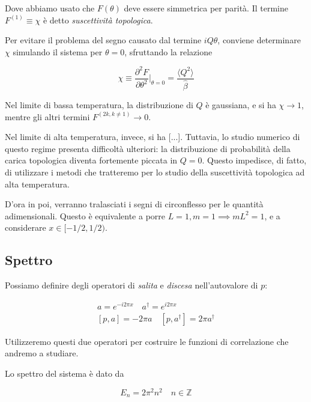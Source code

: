 \documentclass[a4paper,11pt]{article}
\newcommand{\avg}[1]{\langle {#1} \rangle}
\begin{document}
    Dove abbiamo usato che $F(\theta)$ deve essere simmetrica per parità. Il termine $F^{(1)} \equiv \chi$ è detto \emph{suscettività topologica}.
    
    Per evitare il problema del segno causato dal termine $iQ\theta$, conviene determinare $\chi$ simulando il sistema per $\theta = 0$, sfruttando la relazione
    
    \begin{equation}
        \chi \equiv \frac{\partial^2 F}{\partial \theta^2} \bigg\rvert_{\theta = 0} = \frac{\avg{Q^2}}{
        \hat{\beta}}
    \end{equation}
    
    Nel limite di bassa temperatura, la distribuzione di $Q$ è gaussiana, e si ha $\chi \to 1$, mentre gli altri termini $F^{(2k, k \neq 1)} \to 0$.
    
    Nel limite di alta temperatura, invece, si ha [...]. Tuttavia, lo studio numerico di questo regime presenta difficoltà ulteriori: la distribuzione di probabilità della carica topologica diventa fortemente piccata in $Q = 0$. Questo impedisce, di fatto, di utilizzare i metodi che tratteremo per lo studio della suscettività topologica ad alta temperatura.
    
    D'ora in poi, verranno tralasciati i segni di circonflesso per le quantità adimensionali. Questo è equivalente a porre $L=1, m = 1 \implies mL^2 = 1$, e a considerare $x \in [-1/2, 1/2)$.
    
    \subsection{Spettro}
    
    Possiamo definire degli operatori di \emph{salita} e \emph{discesa} nell'autovalore di $p$:
    
    \begin{eqnarray}
        a = e^{-i2\pi x} \quad a^\dagger = e^{i2\pi x} \\
        \left[p, a \right] = - 2\pi a \quad \left[p, a^\dagger \right] = 2 \pi a^\dagger
    \end{eqnarray}

    Utilizzeremo questi due operatori per costruire le funzioni di correlazione che andremo a studiare.
    
    Lo spettro del sistema è dato da
    
    \begin{equation}
        E_n = 2\pi^2 n^2 \quad n \in \mathbb{Z}
    \end{equation}
    
\end{document}
